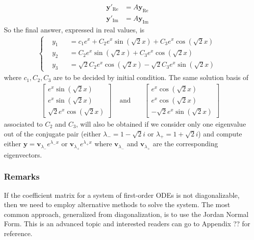 \begin{solution}
\begin{align*}
\textbf{y}'_{\text{Re}} &= A\textbf{y}_{\text{Re}} \\
\textbf{y}'_{\text{Im}} &= A\textbf{y}_{\text{Im}}
\end{align*}
So the final answer, expressed in real values, is
\begin{align*}
\left\{\begin{alignedat}{2}
&y_1 & &= c_1e^x + C_2e^{x}\sin(\sqrt{2}x) + C_3e^{x}\cos(\sqrt{2}x) \\
&y_2 & &= C_2e^{x}\sin(\sqrt{2}x) + C_3e^{x}\cos(\sqrt{2}x) \\
&y_3 & &= \sqrt{2}C_2e^{x}\cos(\sqrt{2}x) - \sqrt{2}C_3e^{x}\sin(\sqrt{2}x)
\end{alignedat}\right.
\end{align*}
where $c_1, C_2, C_3$ are to be decided by initial condition. The same solution basis of 
\begin{align*}
&\begin{bmatrix}
e^{x}\sin(\sqrt{2}x) \\
e^{x}\sin(\sqrt{2}x) \\
\sqrt{2}e^{x}\cos(\sqrt{2}x)
\end{bmatrix}
& \text{ and } &
&\begin{bmatrix}
e^{x}\cos(\sqrt{2}x) \\
e^{x}\cos(\sqrt{2}x) \\
-\sqrt{2}e^{x}\sin(\sqrt{2}x)
\end{bmatrix}
\end{align*}
associated to $C_2$ and $C_3$, will also be obtained if we consider only one eigenvalue out of the conjugate pair (either $\lambda_{-} = 1-\sqrt{2}i$ or $\lambda_{+} = 1+\sqrt{2}i$) and compute either $\textbf{y} = \textbf{v}_{\lambda_{-}}e^{\lambda_{-} x}$ or $\textbf{v}_{\lambda_{+}}e^{\lambda_{+} x}$ where $\textbf{v}_{\lambda_{-}}$ and $\textbf{v}_{\lambda_{+}}$ are the corresponding eigenvectors. 
\end{solution}

\subsubsection{Remarks} If the coefficient matrix for a system of first-order ODEs is not diagonalizable, then we need to employ alternative methods to solve the system. The most common approach, generalized from diagonalization, is to use the Jordan Normal Form. This is an advanced topic and interested readers can go to Appendix ?? for reference.

